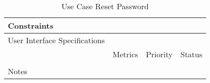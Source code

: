 \begin{table}[H]
\begin{tabularx}{\linewidth}{|l|X|X|X|}
    \hline Constraints                   & \multicolumn{3}{l|}{}                                                                                 \\

    \hline User Interface Specifications & \multicolumn{3}{l|}{}                                                                                 \\

    \hline \multirow{2}{*}{}             & Metrics                                                                           & Priority & Status \\
    \cline{2-4}                          &                                                                                   &          &        \\
    \hline Notes                         & \multicolumn{3}{l|}{}                                                                                 \\
    \hline
  \end{tabularx}
  \caption{Use Case Reset Password}
  \label{tab:use_case_reset_password}
\end{table}

